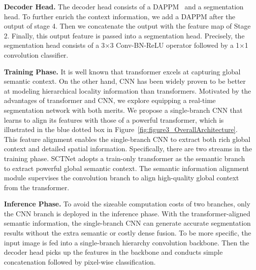 \documentclass[letterpaper]{article} %
\begin{document}
\noindent
{\bf Decoder Head.} The decoder head consists of a DAPPM~\cite{pan2022deep} and a segmentation head. To further enrich the context information, we add a DAPPM after the output of stage 4. Then we concatenate the output with the feature map of Stage 2. Finally, this output feature is passed into a segmentation head. Precisely, the segmentation head consists of a 3$\times$3 Conv-BN-ReLU operator followed by a 1$\times$1 convolution classifier.

\noindent
{\bf Training Phase.} 
It is well known that transformer excels at capturing global semantic context. On the other hand, CNN has been widely proven to be better at modeling hierarchical locality information than transformers. Motivated by the advantages of transformer and CNN, we explore equipping a real-time segmentation network with both merits. We propose a single-branch CNN that learns to align its features with those of a powerful transformer, which is illustrated in the blue dotted box in Figure~\ref{fig:figure3_OverallArchitecture}. This feature alignment enables the single-branch CNN to extract both rich global context and detailed spatial information. Specifically, there are two streams in the training phase. SCTNet adopts a train-only transformer as the semantic branch to extract powerful global semantic context. The semantic information alignment module supervises the convolution branch to align high-quality global context from the transformer.

\noindent
{\bf Inference Phase.} 
To avoid the sizeable computation costs of two branches, only the CNN branch is deployed in the inference phase. With the transformer-aligned semantic information, the single-branch CNN can generate accurate segmentation results without the extra semantic or costly dense fusion. To be more specific, the input image is fed into a single-branch hierarchy convolution backbone. Then the decoder head picks up the features in the backbone and conducts simple concatenation followed by pixel-wise classification. 

\vspace{-4pt}
\noindent
\end{document}
